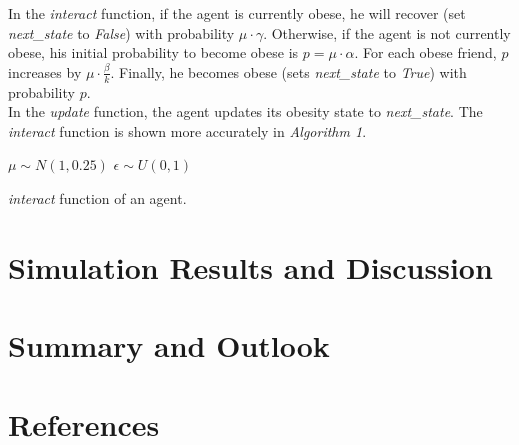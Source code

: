 \documentclass[11pt]{article}
\begin{document}
In the \textit{interact} function, if the agent is currently obese, he will recover (set \textit{next\_state} to \textit{False}) with probability \(\mu \cdot \gamma\). 
Otherwise, if the agent is not currently obese, his initial probability to become obese is \(p = \mu \cdot \alpha\). 
For each obese friend, \(p\) increases by \(\mu \cdot \frac{\beta}{k}\). Finally, he becomes obese (sets \textit{next\_state} to \textit{True}) with probability \(p\). \\

In the \textit{update} function, the agent updates its obesity state to \textit{next\_state}. The \textit{interact} function is shown more accurately in \textit{Algorithm 1}.

\begin{algorithm}[H]

    \(\mu \sim N(1, 0.25)\)\;
    \(\epsilon \sim U(0, 1)\)\;
    \caption{{\textit{interact} function of an agent.} \label{Algorithm}}
\end{algorithm}

\section{Simulation Results and Discussion}

\section{Summary and Outlook}

\section{References}



\end{document}
